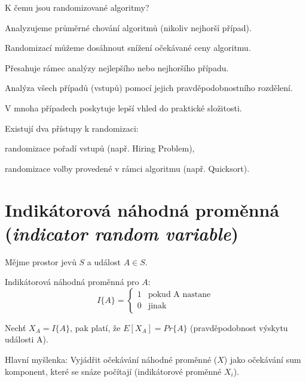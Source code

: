 \begin{compactitem}
    \item K čemu jsou randomizované algoritmy? \begin{compactitem}
        \item Analyzujeme průměrné chování algoritmů (nikoliv nejhorší případ).

        \item Randomizací můžeme dosáhnout snížení očekávané ceny algoritmu.
    \end{compactitem}

    \item Přesahuje rámec analýzy nejlepšího nebo nejhoršího případu. \begin{compactitem}
        \item Analýza všech případů (vstupů) pomocí jejich pravděpodobnostního rozdělení.

        \item V mnoha případech poskytuje lepší vhled do praktické složitosti.

    \end{compactitem}

    \item Existují dva přístupy k randomizaci: \begin{compactitem}
        \item randomizace pořadí vstupů (např. Hiring Problem),

        \item randomizace volby provedené v rámci algoritmu (např. Quicksort).
    \end{compactitem}
\end{compactitem}


\section{Indikátorová náhodná proměnná (\textit{indicator random variable})}

\begin{compactitem}
    \item Mějme prostor jevů $S$ a událost $A \in S$.

    \item Indikátorová náhodná proměnná pro $A$:
    $$ I\{A\} = \left\{
        \begin{array}{ll}
            1 & \text{pokud A nastane} \\
            0 & \text{jinak}
        \end{array}
        \right. $$

    \item Nechť $X_A = I\{A\}$, pak platí, že $E[X_A] = Pr\{A\}$ (pravděpodobnost výskytu události A).

    \item Hlavní myšlenka: Vyjádřit očekávání náhodné proměnné ($X$) jako očekávání sum komponent, které se snáze počítají (indikátorové proměnné $X_i$).
\end{compactitem}

